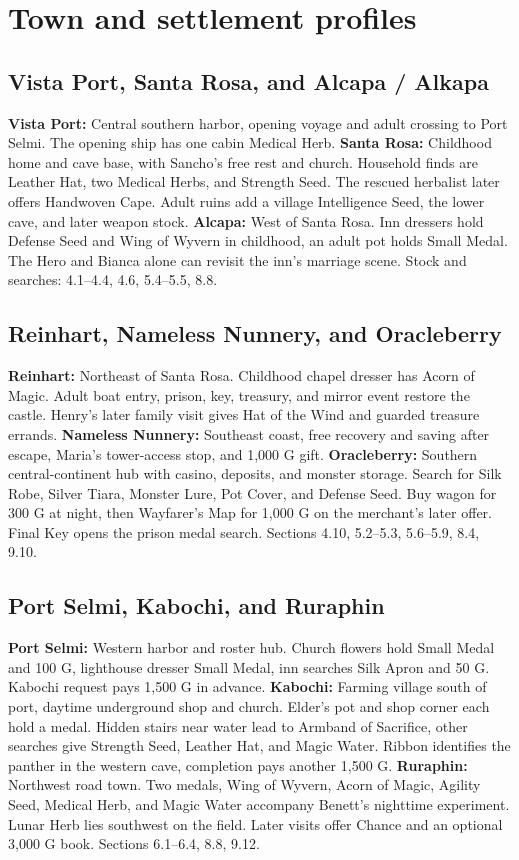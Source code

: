 \section{Town and settlement profiles}
\subsection{Vista Port, Santa Rosa, and Alcapa / Alkapa}
\textbf{Vista Port:} Central southern harbor, opening voyage and adult crossing to Port Selmi. The opening ship has one cabin Medical Herb. \textbf{Santa Rosa:} Childhood home and cave base, with Sancho's free rest and church. Household finds are Leather Hat, two Medical Herbs, and Strength Seed. The rescued herbalist later offers Handwoven Cape. Adult ruins add a village Intelligence Seed, the lower cave, and later weapon stock. \textbf{Alcapa:} West of Santa Rosa. Inn dressers hold Defense Seed and Wing of Wyvern in childhood, an adult pot holds Small Medal. The Hero and Bianca alone can revisit the inn's marriage scene. Stock and searches: 4.1--4.4, 4.6, 5.4--5.5, 8.8.

\subsection{Reinhart, Nameless Nunnery, and Oracleberry}
\textbf{Reinhart:} Northeast of Santa Rosa. Childhood chapel dresser has Acorn of Magic. Adult boat entry, prison, key, treasury, and mirror event restore the castle. Henry's later family visit gives Hat of the Wind and guarded treasure errands. \textbf{Nameless Nunnery:} Southeast coast, free recovery and saving after escape, Maria's tower-access stop, and 1,000 G gift. \textbf{Oracleberry:} Southern central-continent hub with casino, deposits, and monster storage. Search for Silk Robe, Silver Tiara, Monster Lure, Pot Cover, and Defense Seed. Buy wagon for 300 G at night, then Wayfarer's Map for 1,000 G on the merchant's later offer. Final Key opens the prison medal search. Sections 4.10, 5.2--5.3, 5.6--5.9, 8.4, 9.10.

\subsection{Port Selmi, Kabochi, and Ruraphin}
\textbf{Port Selmi:} Western harbor and roster hub. Church flowers hold Small Medal and 100 G, lighthouse dresser Small Medal, inn searches Silk Apron and 50 G. Kabochi request pays 1,500 G in advance. \textbf{Kabochi:} Farming village south of port, daytime underground shop and church. Elder's pot and shop corner each hold a medal. Hidden stairs near water lead to Armband of Sacrifice, other searches give Strength Seed, Leather Hat, and Magic Water. Ribbon identifies the panther in the western cave, completion pays another 1,500 G. \textbf{Ruraphin:} Northwest road town. Two medals, Wing of Wyvern, Acorn of Magic, Agility Seed, Medical Herb, and Magic Water accompany Benett's nighttime experiment. Lunar Herb lies southwest on the field. Later visits offer Chance and an optional 3,000 G book. Sections 6.1--6.4, 8.8, 9.12.

